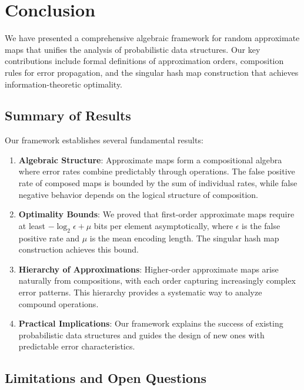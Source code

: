 \providecommand{\mainx}{..}
\section{Conclusion}
\label{sec:conclusion}

We have presented a comprehensive algebraic framework for random approximate maps that unifies the analysis of probabilistic data structures.
Our key contributions include formal definitions of approximation orders, composition rules for error propagation, and the singular hash map construction that achieves information-theoretic optimality.

\subsection{Summary of Results}

Our framework establishes several fundamental results:

\begin{enumerate}
    \item \textbf{Algebraic Structure}: Approximate maps form a compositional algebra where error rates combine predictably through operations.
    The false positive rate of composed maps is bounded by the sum of individual rates, while false negative behavior depends on the logical structure of composition.

    \item \textbf{Optimality Bounds}: We proved that first-order approximate maps require at least $-\log_2 \epsilon + \mu$ bits per element asymptotically, where $\epsilon$ is the false positive rate and $\mu$ is the mean encoding length.
    The singular hash map construction achieves this bound.

    \item \textbf{Hierarchy of Approximations}: Higher-order approximate maps arise naturally from compositions, with each order capturing increasingly complex error patterns.
    This hierarchy provides a systematic way to analyze compound operations.

    \item \textbf{Practical Implications}: Our framework explains the success of existing probabilistic data structures and guides the design of new ones with predictable error characteristics.
\end{enumerate}

\subsection{Limitations and Open Questions}

